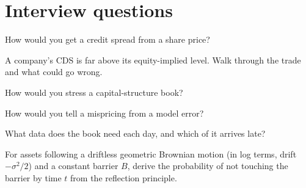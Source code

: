 \section{Interview questions}

\begin{interviewq}\label{iq:s2:capital-structure-arbitrage:1}
How would you get a credit spread from a share price?
\end{interviewq}

\begin{interviewq}\label{iq:s2:capital-structure-arbitrage:2}
A company's CDS is far above its equity-implied level. Walk through the trade and what could go wrong.
\end{interviewq}

\begin{interviewq}\label{iq:s2:capital-structure-arbitrage:3}
How would you stress a capital-structure book?
\end{interviewq}

\begin{interviewq}\label{iq:s2:capital-structure-arbitrage:4}
How would you tell a mispricing from a model error?
\end{interviewq}

\begin{interviewq}\label{iq:s2:capital-structure-arbitrage:5}
What data does the book need each day, and which of it arrives late?
\end{interviewq}

\begin{interviewq}\label{iq:s2:capital-structure-arbitrage:6}
For assets following a driftless geometric Brownian motion (in log terms, drift $-\sigma^2/2$) and a constant barrier $B$, derive the probability of
not touching the barrier by time $t$ from the reflection principle.
\end{interviewq}
